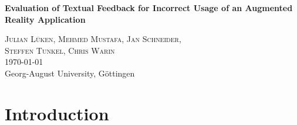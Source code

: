 \documentclass[11pt, a4paper]{article}
\newcommand{\mytitle}{Evaluation of Textual Feedback for Incorrect Usage of an Augmented Reality Application}
\newcommand{\myauthor}{Julian Lüken, Mehmed Mustafa, Jan Schneider,\\ Steffen Tunkel, Chris Warin}
\newcommand{\myuni}{Georg-August University, Göttingen}
\newcommand{\titlespace}{.9em}
\newenvironment{myabstract}{\begin{abstract}\begin{itshape}}{\end{itshape}\end{abstract}}
\begin{document}
	\begin{acronym}
	\end{acronym}

	\pagestyle{empty}
	\begin{center}
		\begin{minipage}{.8\textwidth}
			\centering
			\begin{doublespace}\huge\textbf{\mytitle}\normalsize\\[\titlespace]\end{doublespace}
			\textsc{\myauthor}\\[\titlespace]
			\today\\[\titlespace]
			\myuni
		\end{minipage}
	\end{center}
	\vspace{0em}
	\begin{myabstract}
		\lipsum[1-2]
	\end{myabstract}


	\section*{Introduction}\label{sec:introduction}
\end{document}
